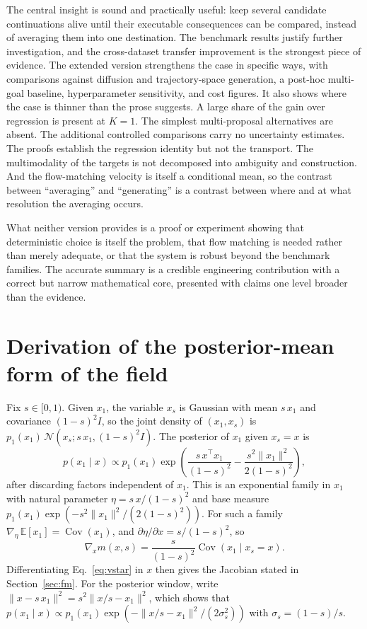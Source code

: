 \documentclass[11pt]{article}
\theoremstyle{plain}
\theoremstyle{remark}
\newcommand{\E}{\mathbb E}
\begin{document}
The central insight is sound and practically useful: keep several candidate continuations alive until their executable consequences can be compared, instead of averaging them into one destination. The benchmark results justify further investigation, and the cross-dataset transfer improvement is the strongest piece of evidence. The extended version strengthens the case in specific ways, with comparisons against diffusion and trajectory-space generation, a post-hoc multi-goal baseline, hyperparameter sensitivity, and cost figures. It also shows where the case is thinner than the prose suggests. A large share of the gain over regression is present at $K=1$. The simplest multi-proposal alternatives are absent. The additional controlled comparisons carry no uncertainty estimates. The proofs establish the regression identity but not the transport. The multimodality of the targets is not decomposed into ambiguity and construction. And the flow-matching velocity is itself a conditional mean, so the contrast between ``averaging'' and ``generating'' is a contrast between where and at what resolution the averaging occurs.

What neither version provides is a proof or experiment showing that deterministic choice is itself the problem, that flow matching is needed rather than merely adequate, or that the system is robust beyond the benchmark families. The accurate summary is a credible engineering contribution with a correct but narrow mathematical core, presented with claims one level broader than the evidence.

\appendix

\section{Derivation of the posterior-mean form of the field}

Fix $s\in[0,1)$. Given $x_1$, the variable $x_s$ is Gaussian with mean $s\,x_1$ and covariance $(1-s)^2I$, so the joint density of $(x_1,x_s)$ is $p_1(x_1)\,\mathcal N(x_s;s\,x_1,(1-s)^2I)$. The posterior of $x_1$ given $x_s=x$ is
\[
p(x_1\mid x)\propto p_1(x_1)\exp\!\left(\frac{s\,x^\top x_1}{(1-s)^2}-\frac{s^2\|x_1\|^2}{2(1-s)^2}\right),
\]
after discarding factors independent of $x_1$. This is an exponential family in $x_1$ with natural parameter $\eta=s\,x/(1-s)^2$ and base measure $p_1(x_1)\exp(-s^2\|x_1\|^2/(2(1-s)^2))$. For such a family $\nabla_\eta\,\E[x_1]=\operatorname{Cov}(x_1)$, and $\partial\eta/\partial x=s/(1-s)^2$, so
\[
\nabla_x m(x,s)=\frac{s}{(1-s)^2}\operatorname{Cov}(x_1\mid x_s=x).
\]
Differentiating Eq.~\eqref{eq:vstar} in $x$ then gives the Jacobian stated in Section~\ref{sec:fm}. For the posterior window, write $\|x-s\,x_1\|^2=s^2\|x/s-x_1\|^2$, which shows that $p(x_1\mid x)\propto p_1(x_1)\exp(-\|x/s-x_1\|^2/(2\sigma_s^2))$ with $\sigma_s=(1-s)/s$.
\end{document}
